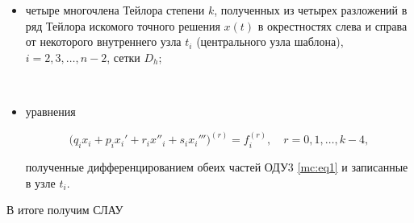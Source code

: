 \begin{itemize}

\item[а)]  четыре многочлена Тейлора степени $   k$, полученных из четырех разложений в ряд Тейлора искомого точного решения $x(t)$ в окрестностях слева и справа от некоторого внутреннего узла $   t_i$ (центрального узла шаблона), $i=2,  3,  \dots,  n-2$, сетки $   D_h$;


\\

\item[ б)]  уравнения

\begin{equation}

\label{mvc:eq3}

  \bigl(q_ix_i+p_ix_i'+r_ix''_i+s_ix_i'''\bigr)^{(r)}=f_i^{(r)}, \quad   r=0,  1,  \dots,  k-4,

\end{equation}

 полученные дифференцированием обеих частей ОДУ3 \eqref{mc:eq1} и записанные в узле $    t_i$.

\end{itemize}



В итоге получим СЛАУ

